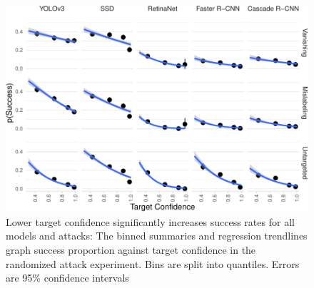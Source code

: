 \documentclass[
]{article}
\begin{document}
\begin{figure}[tb]

{\centering \includegraphics{imgs/target_conf_graph-1} 

}

\caption{Lower target confidence significantly increases success rates for all models and attacks:  The binned summaries and regression trendlines graph success proportion against target confidence in the randomized attack experiment. Bins are split into quantiles. Errors are 95\% confidence intervals}\label{fig:target_conf_graph}
\end{figure}

\begingroup\fontsize{9}{11}\selectfont
\end{document}

